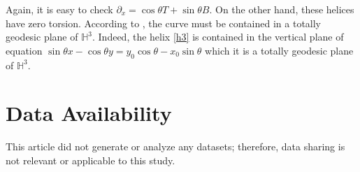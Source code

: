 \documentclass[a4paper,12pt]{amsart}
\theoremstyle{definition}
\def\h{\mathbb H}
\begin{document}
 Again, it is easy to check  $\partial_x=\cos\theta T+\sin\theta B$. On the other hand, these helices have   zero torsion. According to \cite[Thm. 1]{ba}, the curve must be  contained in a totally geodesic plane of $\h^3$. Indeed, the helix   \eqref{h3} is contained in the vertical plane of equation $\sin\theta x-\cos\theta y=y_0\cos\theta-x_0\sin\theta$ which it is a totally geodesic plane of $\h^3$. 
  

\section*{Data Availability}

This article did not generate or analyze any datasets; therefore, data sharing is not relevant or applicable to this study.

\end{document}
